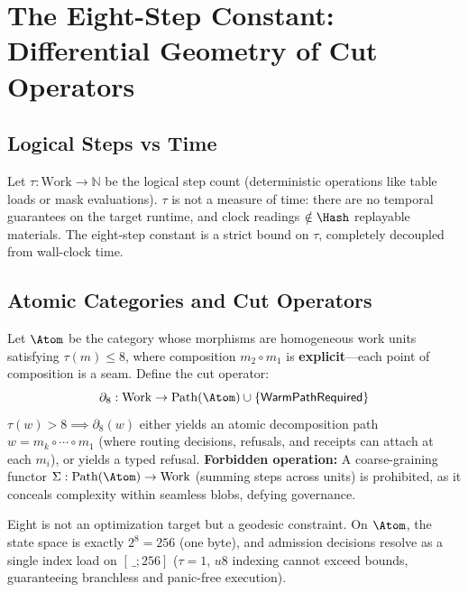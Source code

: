 \chapter{The Eight-Step Constant: Differential Geometry of Cut Operators}

\section{Logical Steps vs Time}

\begin{axiom}
Let $\tau : \mathrm{Work} \to \mathbb{N}$ be the logical step count (deterministic operations like table loads or mask evaluations). $\tau$ is not a measure of time: there are no temporal guarantees on the target runtime, and clock readings $\notin \Hash$ replayable materials. The eight-step constant is a strict bound on $\tau$, completely decoupled from wall-clock time.
\end{axiom}

\section{Atomic Categories and Cut Operators}

\begin{defn}
Let $\Atom$ be the category whose morphisms are homogeneous work units satisfying $\tau(m) \le 8$, where composition $m_2 \circ m_1$ is \textbf{explicit}---each point of composition is a seam. Define the cut operator:
\[
\partial_8 : \mathrm{Work} \to \mathrm{Path}(\Atom) \cup \{\mathsf{WarmPathRequired}\}
\]
$\tau(w) > 8 \implies \partial_8(w)$ either yields an atomic decomposition path $w = m_k \circ \cdots \circ m_1$ (where routing decisions, refusals, and receipts can attach at each $m_i$), or yields a typed refusal. \textbf{Forbidden operation:} A coarse-graining functor $\Sigma : \mathrm{Path}(\Atom) \to \mathrm{Work}$ (summing steps across units) is prohibited, as it conceals complexity within seamless blobs, defying governance.
\end{defn}

\begin{thm}
Eight is not an optimization target but a geodesic constraint. On $\Atom$, the state space is exactly $2^8 = 256$ (one byte), and admission decisions resolve as a single index load on $[\,\_;256]$ ($\tau=1$, $u8$ indexing cannot exceed bounds, guaranteeing branchless and panic-free execution).
\end{thm}

